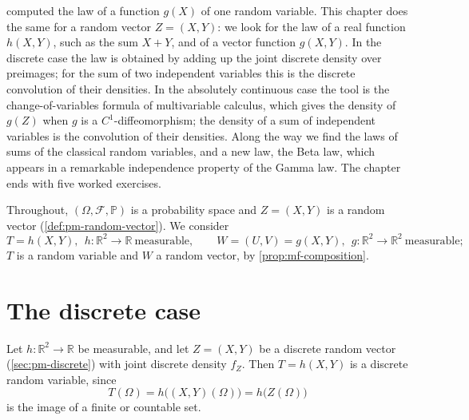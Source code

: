 
 computed the law of a function $g(X)$ of one random variable. This
chapter does the same for a random vector $Z=(X,Y)$: we look for the law of a real function
$h(X,Y)$, such as the sum $X+Y$, and of a vector function $g(X,Y)$. In the discrete case the law is
obtained by adding up the joint discrete density over preimages; for the sum of two independent
variables this is the discrete convolution of their densities. In the absolutely continuous case
the tool is the change-of-variables formula of multivariable calculus, which gives the density of
$g(Z)$ when $g$ is a $C^1$-diffeomorphism; the density of a sum of independent variables is the
convolution of their densities. Along the way we find the laws of sums of the classical random
variables, and a new law, the Beta law, which appears in a remarkable independence property of the
Gamma law. The chapter ends with five worked exercises.

Throughout, $(\Omega,\mathcal F,\mathbb P)$ is a probability space and $Z=(X,Y)$ is a random vector
(\cref{def:pm-random-vector}). We consider
\[
  T=h(X,Y),\ \ h:\mathbb R^2\to\mathbb R\ \text{measurable},\qquad
  W=(U,V)=g(X,Y),\ \ g:\mathbb R^2\to\mathbb R^2\ \text{measurable};
\]
$T$ is a random variable and $W$ a random vector, by \cref{prop:mf-composition}.

\section{The discrete case}\label{sec:rv-discrete}

Let $h:\mathbb R^2\to\mathbb R$ be measurable, and let $Z=(X,Y)$ be a discrete random vector
(\cref{sec:pm-discrete}) with joint discrete density $f_Z$. Then $T=h(X,Y)$ is a discrete random
variable, since
\[
  T(\Omega)=h\big((X,Y)(\Omega)\big)=h\big(Z(\Omega)\big)
\]
is the image of a finite or countable set.

